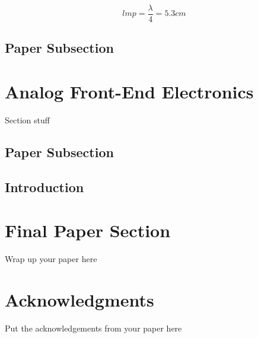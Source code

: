 {\begin{equation}
    lmp= \frac{\lambda}{4} = 5.3 cm
    \label{eq:8}
\end{equation}





\subsection{Paper Subsection}
\section{Analog Front-End Electronics}
Section stuff

\subsection{Paper Subsection}
\subsection{Introduction}




\section{Final Paper Section}
Wrap up your paper here

\section*{Acknowledgments}
Put the acknowledgements from your paper here





}